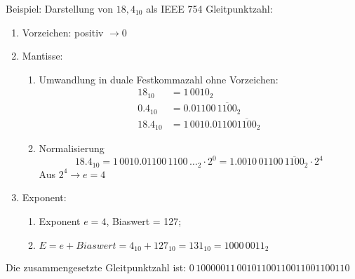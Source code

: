Beispiel: Darstellung von $18{,}4_{10}$ als IEEE 754 Gleitpunktzahl:
\begin{enumerate}
	\item Vorzeichen: positiv $\rightarrow 0$ 
	\item Mantisse:
		\begin{enumerate}
			\item Umwandlung in duale Festkommazahl ohne Vorzeichen:
			\begin{align*}
				18_{10}& = 1\,0010_2\\
				0.4_{10}& = 0.01100\,\overline{1100}_2\\
				18.4_{10}& = 1\,0010.01100\overline{1100}_2
			\end{align*}
			\item Normalisierung
			\begin{equation*}
				18.4_{10} = 1\,0010.01100\,1100\,\dots_2 \cdot 2^0 = 
1.0010\,01100\,\overline{1100}_2 \cdot 2^4
			\end{equation*}
			Aus $2^4 \rightarrow e = 4$
		\end{enumerate}
	\item Exponent:
		\begin{enumerate}
			\item Exponent $e=4$, Biaswert = 127;
			\item $E = e + Biaswert = 4_{10} + 127_{10} = 131_{10} = 1000\,0011_2$
		\end{enumerate}
\end{enumerate}
Die zusammengesetzte Gleitpunktzahl ist: $0\,10000011\,00101100110011001100110$